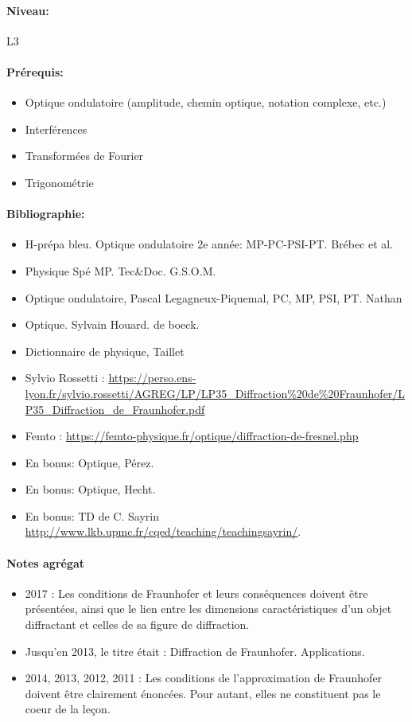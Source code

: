 \documentclass[11pt]{report}
\numberwithin{figure}{section}
\numberwithin{equation}{section}
\numberwithin{table}{section}
\newcommand{\1}{\boldsymbol{1}}
\begin{document}
\paragraph*{Niveau:} L3
\paragraph*{Prérequis:} 
\begin{itemize}
\item Optique ondulatoire (amplitude, chemin optique, notation complexe, etc.)
\item Interférences
\item Transformées de Fourier
\item Trigonométrie
\end{itemize}

\paragraph*{Bibliographie:}
\begin{itemize}
\item H-prépa bleu. Optique ondulatoire 2e année: MP-PC-PSI-PT. Brébec et al.
\item Physique Spé MP. Tec\&Doc. G.S.O.M.
\item Optique ondulatoire, Pascal Legagneux-Piquemal, PC, MP, PSI, PT. Nathan
\item Optique. Sylvain Houard. de boeck.
\item Dictionnaire de physique, Taillet
\item Sylvio Rossetti : \url{https://perso.ens-lyon.fr/sylvio.rossetti/AGREG/LP/LP35_Diffraction%20de%20Fraunhofer/LP35_Diffraction_de_Fraunhofer.pdf}
\item Femto : \url{https://femto-physique.fr/optique/diffraction-de-fresnel.php}
\item En bonus: Optique, Pérez.
\item En bonus: Optique, Hecht.
\item En bonus: TD de C. Sayrin \url{http://www.lkb.upmc.fr/cqed/teaching/teachingsayrin/}.
\end{itemize}

\paragraph{Notes agrégat}
\begin{itemize}
\item 2017 : Les conditions de Fraunhofer et leurs conséquences doivent être présentées, ainsi que
le lien entre les dimensions caractéristiques d’un objet diffractant et celles de sa figure
de diffraction.
\item Jusqu’en 2013, le titre était : Diffraction de Fraunhofer. Applications.
\item 2014, 2013, 2012, 2011 : Les conditions de l’approximation de Fraunhofer doivent être
clairement énoncées. Pour autant, elles ne constituent pas le coeur de la leçon.
\end{itemize}
\end{document}
